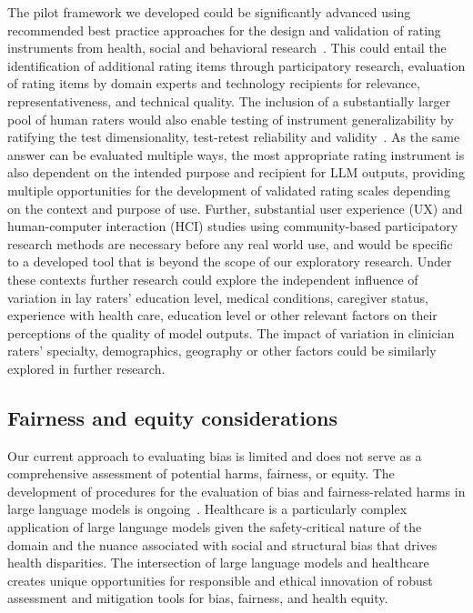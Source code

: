 The pilot framework we developed could be significantly advanced using recommended best practice approaches for the design and validation of rating instruments from health, social and behavioral research~\cite{boateng2018best}. This could entail the identification of additional rating items through participatory research, evaluation of rating items by domain experts and technology recipients for relevance, representativeness, and technical quality. The inclusion of a substantially larger pool of human raters would also enable testing of instrument generalizability by ratifying the test dimensionality, test-retest reliability and validity~\cite{boateng2018best}.  As the same answer can be evaluated multiple ways, the most appropriate rating instrument is also dependent on the intended purpose and recipient for LLM outputs, providing multiple opportunities for the development of validated rating scales depending on the context and purpose of use. Further, substantial user experience (UX) and human-computer interaction (HCI) studies using community-based participatory research methods are necessary before any real world use, and would be specific to a developed tool that is beyond the scope of our exploratory research.  Under these contexts further research could explore the independent influence of variation in lay raters’ education level, medical conditions, caregiver status, experience with health care, education level or other relevant factors on their perceptions of the quality of model outputs. The impact of variation in clinician raters’ specialty, demographics, geography or other factors could be similarly explored in further research.

\subsection{Fairness and equity considerations} Our current approach to evaluating bias is limited and does not serve as a comprehensive assessment of potential harms, fairness, or equity. The development of procedures for the evaluation of bias and fairness-related harms in large language models is ongoing~\cite{weidinger2021ethical, liang2022holistic}. Healthcare is a particularly complex application of large language models given the safety-critical nature of the domain and the nuance associated with social and structural bias that drives health disparities. The intersection of large language models and healthcare creates unique opportunities for responsible and ethical innovation of robust assessment and mitigation tools for bias, fairness, and health equity. 

